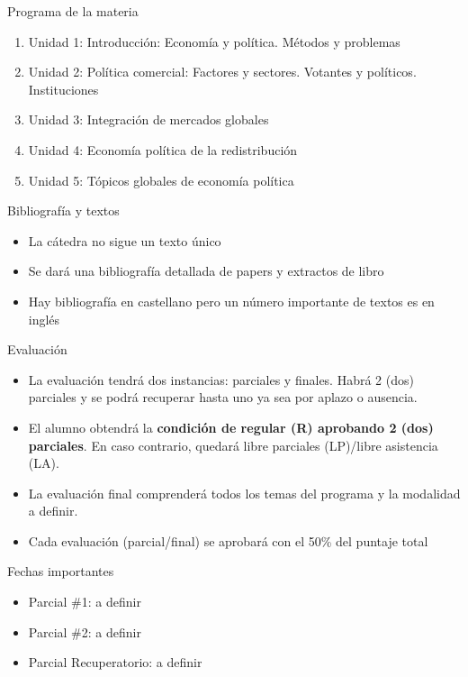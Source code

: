 \documentclass[
  ignorenonframetext,
]{beamer}
\providecommand{\tightlist}{%
  \setlength{\itemsep}{0pt}\setlength{\parskip}{0pt}}\usepackage{longtable,booktabs,array}
\begin{document}
\begin{frame}{Programa de la materia}
\protect\hypertarget{programa-de-la-materia}{}
\begin{enumerate}
\tightlist
\item
  Unidad 1: Introducción: Economía y política. Métodos y problemas
\item
  Unidad 2: Política comercial: Factores y sectores. Votantes y
  políticos. Instituciones
\item
  Unidad 3: Integración de mercados globales
\item
  Unidad 4: Economía política de la redistribución
\item
  Unidad 5: Tópicos globales de economía política
\end{enumerate}
\end{frame}

\begin{frame}{Bibliografía y textos}
\protect\hypertarget{bibliografuxeda-y-textos}{}
\begin{itemize}
\tightlist
\item
  La cátedra no sigue un texto único
\item
  Se dará una bibliografía detallada de papers y extractos de libro
\item
  Hay bibliografía en castellano pero un número importante de textos es
  en inglés
\end{itemize}
\end{frame}

\begin{frame}{Evaluación}
\protect\hypertarget{evaluaciuxf3n}{}
\begin{itemize}
\tightlist
\item
  La evaluación tendrá dos instancias: parciales y finales. Habrá 2
  (dos) parciales y se podrá recuperar hasta uno ya sea por aplazo o
  ausencia.
\item
  El alumno obtendrá la \textbf{condición de regular (R) aprobando 2
  (dos) parciales}. En caso contrario, quedará libre parciales
  (LP)/libre asistencia (LA).
\item
  La evaluación final comprenderá todos los temas del programa y la
  modalidad a definir.
\item
  Cada evaluación (parcial/final) se aprobará con el 50\% del puntaje
  total
\end{itemize}
\end{frame}

\begin{frame}{Fechas importantes}
\protect\hypertarget{fechas-importantes}{}
\begin{itemize}
\tightlist
\item
  Parcial \#1: a definir
\item
  Parcial \#2: a definir
\item
  Parcial Recuperatorio: a definir
\end{itemize}
\end{frame}
\end{document}

